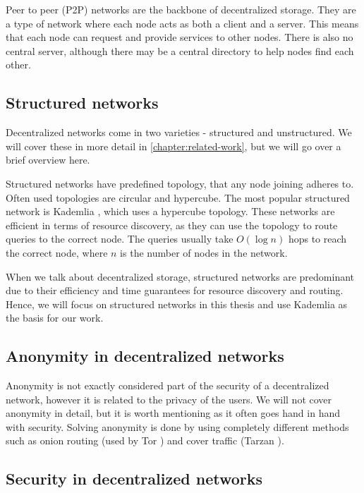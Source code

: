 Peer to peer (P2P) networks are the backbone of decentralized storage.
They are a type of network where each node acts as both a client and a server.
This means that each node can request and provide services to other nodes.
There is also no central server, although there may be a central directory to help nodes find each other.

\subsection{Structured networks}

Decentralized networks come in two varieties - structured and unstructured.
We will cover these in more detail in \ref{chapter:related-work}, but we will go over a brief overview here.

Structured networks have predefined topology, that any node joining adheres to.
Often used topologies are circular and hypercube.
The most popular structured network is Kademlia \cite{kademlia}, which uses a hypercube topology.
These networks are efficient in terms of resource discovery, as they can use the topology to
route queries to the correct node.
The queries usually take $O(\log n)$ hops to reach the correct node, where $n$ is the number of
nodes in the network.

When we talk about decentralized storage, structured networks are predominant due to their efficiency and
time guarantees for resource discovery and routing.
Hence, we will focus on structured networks in this thesis and use Kademlia as the basis for our work.

\subsection{Anonymity in decentralized networks}

Anonymity is not exactly considered part of the security of a decentralized network, 
however it is related to the privacy of the users.
We will not cover anonymity in detail, but it is worth mentioning as it often goes hand in hand with security.
Solving anonymity is done by using completely different methods such as
onion routing (used by Tor \cite{tor}) and cover traffic (Tarzan \cite{tarzan}).

\subsection{Security in decentralized networks}

